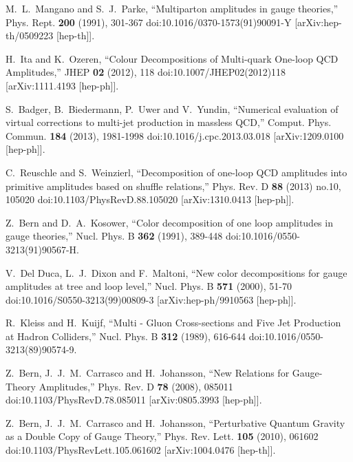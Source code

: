 M.~L.~Mangano and S.~J.~Parke,
``Multiparton amplitudes in gauge theories,''
Phys. Rept. \textbf{200} (1991), 301-367
doi:10.1016/0370-1573(91)90091-Y
[arXiv:hep-th/0509223 [hep-th]].

H.~Ita and K.~Ozeren,
``Colour Decompositions of Multi-quark One-loop QCD Amplitudes,''
JHEP \textbf{02} (2012), 118
doi:10.1007/JHEP02(2012)118
[arXiv:1111.4193 [hep-ph]].

S.~Badger, B.~Biedermann, P.~Uwer and V.~Yundin,
``Numerical evaluation of virtual corrections to multi-jet production in massless QCD,''
Comput. Phys. Commun. \textbf{184} (2013), 1981-1998
doi:10.1016/j.cpc.2013.03.018
[arXiv:1209.0100 [hep-ph]].

C.~Reuschle and S.~Weinzierl,
``Decomposition of one-loop QCD amplitudes into primitive amplitudes based on shuffle relations,''
Phys. Rev. D \textbf{88} (2013) no.10, 105020
doi:10.1103/PhysRevD.88.105020
[arXiv:1310.0413 [hep-ph]].

Z.~Bern and D.~A.~Kosower,
``Color decomposition of one loop amplitudes in gauge theories,''
Nucl. Phys. B \textbf{362} (1991), 389-448
doi:10.1016/0550-3213(91)90567-H.

V.~Del Duca, L.~J.~Dixon and F.~Maltoni,
``New color decompositions for gauge amplitudes at tree and loop level,''
Nucl. Phys. B \textbf{571} (2000), 51-70
doi:10.1016/S0550-3213(99)00809-3
[arXiv:hep-ph/9910563 [hep-ph]].

R.~Kleiss and H.~Kuijf,
``Multi - Gluon Cross-sections and Five Jet Production at Hadron Colliders,''
Nucl. Phys. B \textbf{312} (1989), 616-644
doi:10.1016/0550-3213(89)90574-9.

Z.~Bern, J.~J.~M.~Carrasco and H.~Johansson,
``New Relations for Gauge-Theory Amplitudes,''
Phys. Rev. D \textbf{78} (2008), 085011
doi:10.1103/PhysRevD.78.085011
[arXiv:0805.3993 [hep-ph]].

Z.~Bern, J.~J.~M.~Carrasco and H.~Johansson,
``Perturbative Quantum Gravity as a Double Copy of Gauge Theory,''
Phys. Rev. Lett. \textbf{105} (2010), 061602
doi:10.1103/PhysRevLett.105.061602
[arXiv:1004.0476 [hep-th]].


